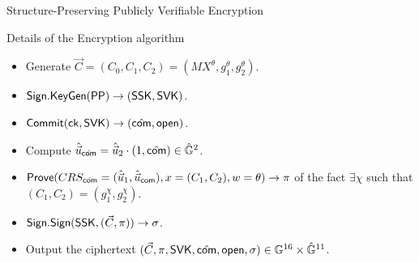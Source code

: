 \begin{frame}{Structure-Preserving Publicly Verifiable Encryption}
  \begin{block}{Details of the Encryption algorithm}
   
    \begin{itemize}
    \item Generate $\vec{C} = (C_0, C_1, C_2) = (MX^{\theta}, g_1^{\theta},  g_2^{\theta})$.
    \item ${\mathsf{Sign}}.{\mathsf{KeyGen}}(\mathsf{PP}) \to (\mathsf{SSK}, \mathsf{SVK})$.
    \item ${\mathsf{Commit}}(\mathsf{ck}, \mathsf{SVK}) \to (\hat{\mathsf{com}}, \mathsf{open})$.
    \item Compute $\hat{\vec{u}}_{\hat{\mathsf{com}}} = \hat{\vec{u}}_2 \cdot (1, \hat{\mathsf{com}}) \in \hat{\mathbb{G}}^2$.
    \item ${\mathsf{Prove}}(CRS_{\hat{\mathsf{com}}} = (\hat{\vec{u}}_1, \hat{\vec{u}}_{\mathsf{com}}), x = (C_1, C_2), w = \theta) \to \pi$ of the fact $\exists \chi$ such that $(C_1, C_2) = (g_1^\chi, g_2^\chi)$.
    \item ${\mathsf{Sign}}.{\mathsf{Sign}}(\mathsf{SSK},(\vec{C},\pi)) \to \sigma$.
    \item Output the ciphertext $(\vec{C}, \pi, \mathsf{SVK}, \hat{\mathsf{com}}, \mathsf{open}, \sigma) \in \mathbb{G}^{16} \times \hat{\mathbb{G}}^{11}$.
    \end{itemize}

  \end{block}
\end{frame}

